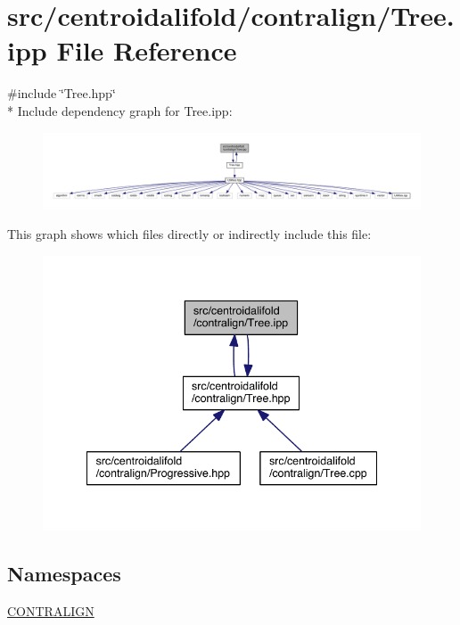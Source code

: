 \hypertarget{_tree_8ipp}{\section{src/centroidalifold/contralign/\+Tree.ipp File Reference}
\label{_tree_8ipp}
}
{\ttfamily \#include \char`\"{}Tree.\+hpp\char`\"{}}\\*
Include dependency graph for Tree.\+ipp\+:
\nopagebreak
\begin{figure}[H]
\begin{center}
\leavevmode
\includegraphics[width=350pt]{_tree_8ipp__incl}
\end{center}
\end{figure}
This graph shows which files directly or indirectly include this file\+:
\nopagebreak
\begin{figure}[H]
\begin{center}
\leavevmode
\includegraphics[width=341pt]{_tree_8ipp__dep__incl}
\end{center}
\end{figure}
\subsection*{Namespaces}
\begin{DoxyCompactItemize}
\item 
 \hyperlink{namespace_c_o_n_t_r_a_l_i_g_n}{C\+O\+N\+T\+R\+A\+L\+I\+G\+N}
\end{DoxyCompactItemize}
